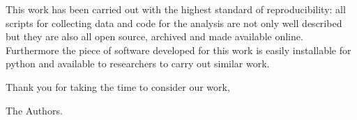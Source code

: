 \documentclass{article}
\begin{document}
This work has been carried out with the highest standard of reproducibility: all
scripts for collecting data and code for the analysis are not only well
described but they are also all open source, archived and made available online.
Furthermore the piece of software developed for this work is easily installable
for python and available to researchers to carry out similar work.


Thank you for taking the time to consider our work,

The Authors.
\end{document}

